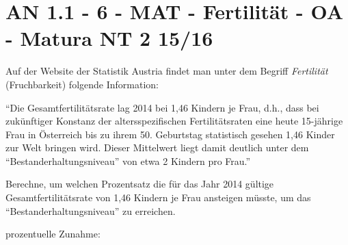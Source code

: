 \section{AN 1.1 - 6 - MAT - Fertilität - OA - Matura NT 2 15/16}

\begin{beispiel}[AN 1.1]{1} %
Auf der Website der Statistik Austria findet man unter dem Begriff \textit{Fertilität} (Fruchbarkeit) folgende Information:

"`Die Gesamtfertilitätsrate lag 2014 bei 1,46 Kindern je Frau, d.h., dass bei zukünftiger Konstanz der altersspezifischen Fertilitätsraten eine heute 15-jährige Frau in Österreich bis zu ihrem 50. Geburtstag statistisch gesehen 1,46 Kinder zur Welt bringen wird. Dieser Mittelwert liegt damit deutlich unter dem "`Bestanderhaltungsniveau"' von etwa 2 Kindern pro Frau."'

Berechne, um welchen Prozentsatz die für das Jahr 2014 gültige Gesamtfertilitätsrate von 1,46 Kindern je Frau ansteigen müsste, um das "`Bestanderhaltungsniveau"' zu erreichen.

prozentuelle Zunahme: 
\end{beispiel}